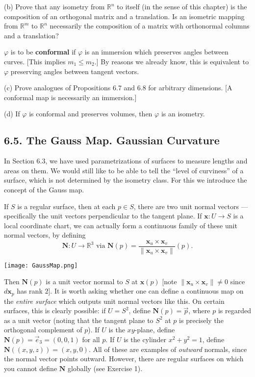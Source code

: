 \documentclass[leqno]{book}
\begin{document}
\begin{enumerate}
(b) Prove that any isometry from $\mathbb R^n$ to itself (in the sense of this chapter) is the composition of an orthogonal matrix and a translation.  Is an isometric mapping from $\mathbb R^m$ to $\mathbb R^n$ necessarily the composition of a matrix with orthonormal columns and a translation?

$\varphi$ is to be \textbf{conformal} if $\varphi$ is an immersion which preserves angles between curves.  [This implies $m_1\leqslant m_2$.]  By reasons we already know, this is equivalent to $\varphi$ preserving angles between tangent vectors.

(c) Prove analogues of Propositions 6.7 and 6.8 for arbitrary dimensions.  [A conformal map is necessarily an immersion.]

(d) If $\varphi$ is conformal and preserves volumes, then $\varphi$ is an isometry.
\end{enumerate}

\subsection*{6.5. The Gauss Map.  Gaussian Curvature}
In Section 6.3, we have used parametrizations of surfaces to measure lengths and areas on them.  We would still like to be able to tell the ``level of curviness'' of a surface, which is not determined by the isometry class.  For this we introduce the concept of the Gauss map.

If $S$ is a regular surface, then at each $p\in S$, there are two unit normal vectors \---- specifically the unit vectors perpendicular to the tangent plane.  If $\mathbf x:U\to S$ is a local coordinate chart, we can actually form a continuous family of these unit normal vectors, by defining
$$\mathbf N:U\to\mathbb R^3\text{ via }\mathbf N(p)=\frac{\mathbf x_u\times\mathbf x_v}{\|\mathbf x_u\times\mathbf x_v\|}(p).$$
\begin{center}
\texttt{[image: GaussMap.png]}
\end{center}
Then $\mathbf N(p)$ is a unit vector normal to $S$ at $\mathbf x(p)$ [note $\|\mathbf x_u\times\mathbf x_v\|\ne 0$ since $d\mathbf x_p$ has rank $2$].  It is worth asking whether one can define a continuous map on the \emph{entire surface} which outputs unit normal vectors like this.  On certain surfaces, this is clearly possible: if $U=S^2$, define $\mathbf N(p)=\vec p$, where $p$ is regarded as a unit vector (noting that the tangent plane to $S^2$ at $p$ is precisely the orthogonal complement of $p$).  If $U$ is the $xy$-plane, define $\mathbf N(p)=\vec e_3=(0,0,1)$ for all $p$.  If $U$ is the cylinder $x^2+y^2=1$, define $\mathbf N((x,y,z))=(x,y,0)$.  All of these are examples of \emph{outward} normals, since the normal vector points outward.  However, there are regular surfaces on which you cannot define $\mathbf N$ globally (see Exercise 1).
\end{document}
